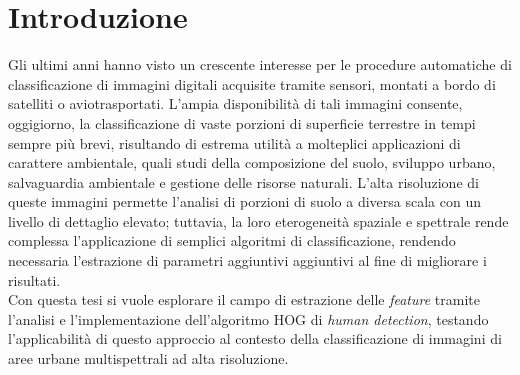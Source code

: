 

\chapter*{Introduzione}
\label{Introduzione}


Gli ultimi anni hanno visto un crescente interesse per le procedure automatiche di classificazione di immagini digitali acquisite tramite sensori, montati a bordo di satelliti o aviotrasportati. 
L'ampia disponibilità di tali immagini consente, oggigiorno, la classificazione di vaste porzioni di superficie terrestre in tempi sempre più brevi, risultando di estrema utilità a molteplici applicazioni di carattere ambientale, quali studi della composizione del suolo, sviluppo urbano, salvaguardia ambientale e gestione delle risorse naturali. 
L'alta risoluzione di queste immagini permette l'analisi di porzioni di suolo a diversa scala con un  livello di dettaglio elevato; tuttavia, la loro eterogeneità spaziale e spettrale rende complessa l'applicazione di semplici algoritmi di classificazione, rendendo necessaria l'estrazione di parametri aggiuntivi aggiuntivi al fine di migliorare i risultati.\\
Con questa tesi si vuole esplorare il campo di estrazione delle \emph{feature} tramite l'analisi e l'implementazione dell'algoritmo HOG di \emph{human detection}, testando l'applicabilità di questo approccio al contesto della classificazione di immagini di aree urbane multispettrali ad alta risoluzione.\\

